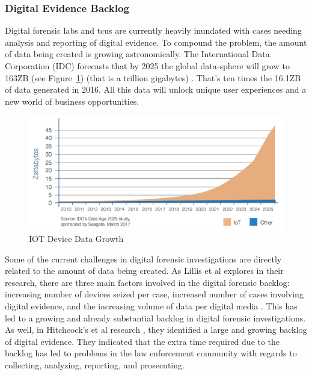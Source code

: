 \documentclass[12pt]{article}
\begin{document}
\subsubsection{Digital Evidence Backlog}

Digital forensic labs and \glspl{tcu} are currently heavily inundated with cases needing
analysis and reporting of digital evidence.  To compound the problem, the amount of
data being created is growing astronomically.  The International Data Corporation
(IDC) forecasts that by 2025 the global data-sphere will grow to 163ZB (see
Figure~\ref{fig:IOT}) (that is a trillion gigabytes) \cite{IDCDataAge2017}. That's ten times the 16.1ZB
of data generated in 2016. All this data will unlock unique user experiences and
a new world of business opportunities.\\

\begin{figure}[H]
  \centering
    \includegraphics[width=\textwidth]{images/IOT_chart.jpg}
  \caption{IOT Device Data Growth}
  \label{fig:IOT}
\end{figure}

Some of the current challenges in digital forensic investigations are directly
related to the amount of data being created.  As Lillis et al
explores in their research, there are three main factors involved in the digital
forensic backlog: increasing number of devices seized per case, increased number of
cases involving digital evidence, and the increasing volume of data per digital
media \cite{lillis2016current}.  This has led to a growing and already substantial
backlog in digital forensic investigations.\\

As well, in Hitchcock's et al research \cite{hitchcock2016tiered}, they identified
a large and growing backlog of digital evidence.  They indicated that the extra
time required due to the backlog has led to problems in the law enforcement
community with regards to collecting, analyzing, reporting, and prosecuting.\\
\end{document}

